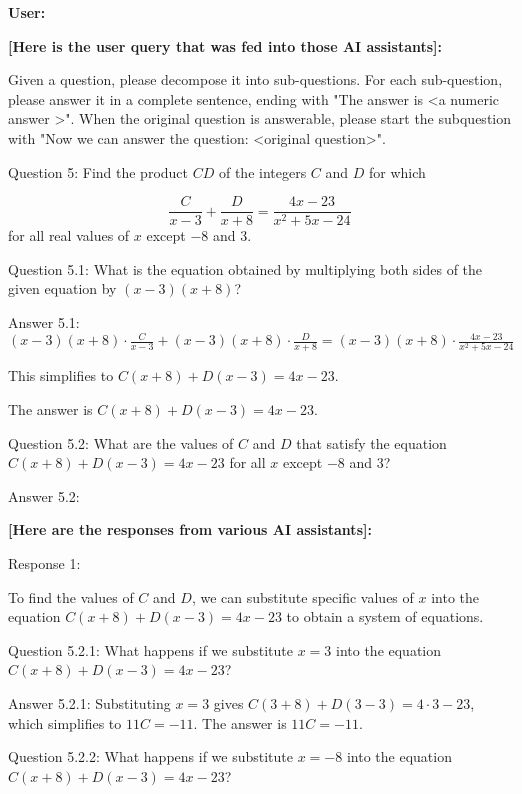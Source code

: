 \begin{center}
	\small
	\begin{tcolorbox}[width=1\linewidth,title={\textbf{An Example ICL Demonstration of MATH-500 for Aggregators: User Query}}]

\textbf{User:}


\textbf{[Here is the user query that was fed into those AI assistants]:}

Given a question, please decompose it into sub-questions. For each sub-question, please answer it in a complete sentence, ending with "The answer is \textless a numeric answer \textgreater". When the original question is answerable, please start the subquestion with "Now we can answer the question: \textless{}original question\textgreater{}".

Question 5: Find the product $CD$ of the integers $C$ and $D$ for which

\[\frac{C}{x-3}+\frac{D}{x+8}=\frac{4x-23}{x^2+5x-24}\]for all real values of $x$ except $-8$ and $3$.

Question 5.1: What is the equation obtained by multiplying both sides of the given equation by $(x - 3)(x + 8)$?

Answer 5.1: $(x - 3)(x + 8) \cdot \frac{C}{x-3} + (x - 3)(x + 8) \cdot \frac{D}{x+8} = (x - 3)(x + 8) \cdot \frac{4x-23}{x^2+5x-24}$

This simplifies to $C(x + 8) + D(x - 3) = 4x - 23$.

The answer is $C(x + 8) + D(x - 3) = 4x - 23$.

Question 5.2: What are the values of $C$ and $D$ that satisfy the equation $C(x + 8) + D(x - 3) = 4x - 23$ for all $x$ except $-8$ and $3$?

Answer 5.2:


\textbf{[Here are the responses from various AI assistants]:}

Response 1:

To find the values of $C$ and $D$, we can substitute specific values of $x$ into the equation $C(x + 8) + D(x - 3) = 4x - 23$ to obtain a system of equations. 

Question 5.2.1: What happens if we substitute $x = 3$ into the equation $C(x + 8) + D(x - 3) = 4x - 23$?

Answer 5.2.1: Substituting $x = 3$ gives $C(3 + 8) + D(3 - 3) = 4 \cdot 3 - 23$, which simplifies to $11C = -11$. The answer is $11C = -11$.

Question 5.2.2: What happens if we substitute $x = -8$ into the equation $C(x + 8) + D(x - 3) = 4x - 23$?


\end{tcolorbox}
\end{center}
